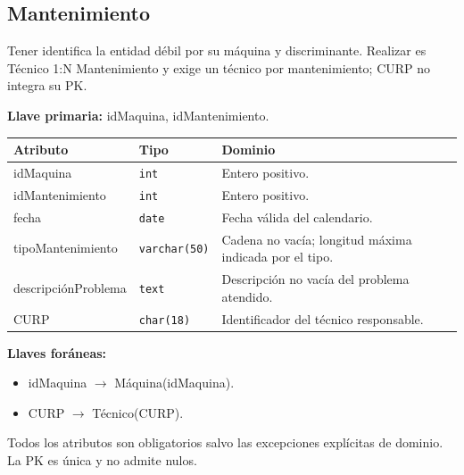 \par\noindent\begin{minipage}{\textwidth}
\subsection{Mantenimiento}
Tener identifica la entidad débil por su máquina y discriminante. Realizar es Técnico 1:N Mantenimiento y exige un técnico por mantenimiento; CURP no integra su PK.\par
\textbf{Llave primaria:} idMaquina, idMantenimiento.\par
{\small\begin{tabular}{@{}p{}p{}p{}@{}}
\toprule Atributo & Tipo & Dominio \\ \midrule
idMaquina & \texttt{int} & Entero positivo. \\
idMantenimiento & \texttt{int} & Entero positivo. \\
fecha & \texttt{date} & Fecha válida del calendario. \\
tipoMantenimiento & \texttt{varchar(50)} & Cadena no vacía; longitud máxima indicada por el tipo. \\
descripciónProblema & \texttt{text} & Descripción no vacía del problema atendido. \\
CURP & \texttt{char(18)} & Identificador del técnico responsable. \\
\bottomrule\end{tabular}}
\textbf{Llaves foráneas:}\begin{itemize}[nosep]
\item idMaquina $\rightarrow$ Máquina(idMaquina).
\item CURP $\rightarrow$ Técnico(CURP).
\end{itemize}
Todos los atributos son obligatorios salvo las excepciones explícitas de dominio. La PK es única y no admite nulos.
\end{minipage}\par\vspace{.35cm}